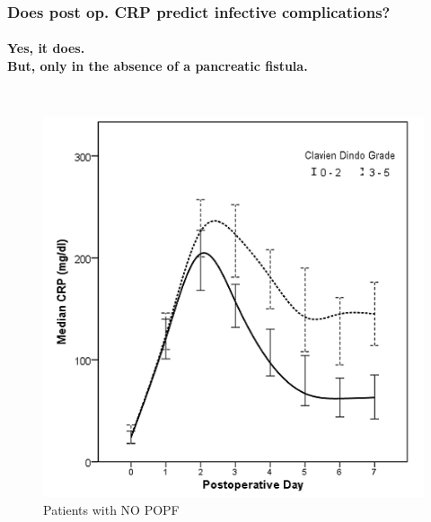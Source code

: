 \documentclass[10pt]{beamer}
\begin{document}
\begin{frame}
\end{frame}

\begin{frame}
	\frametitle{Does post op. CRP predict infective complications?}
	\framesubtitle{Yes, it does. \\ But, only in the absence of a pancreatic fistula. }
	
	\begin{columns}
		\begin{figure}
			\includegraphics[width=\textwidth]{../Figures/crp_comp_infective_leak0}
			\\ Patients with NO POPF
		\end{figure}
	

\end{columns}
\end{frame}
\end{document}
